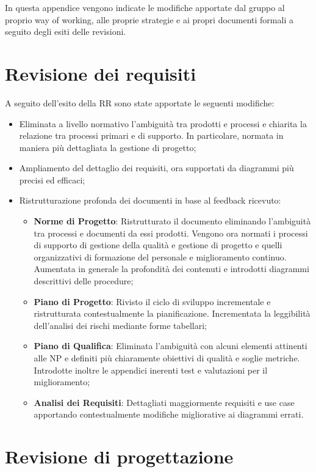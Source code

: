 \documentclass[openany,12pt,a4paper]{report}
\begin{document}
In questa appendice vengono indicate le modifiche apportate dal gruppo al proprio way of working, alle proprie strategie e ai propri documenti formali a seguito degli esiti delle revisioni.

\section{Revisione dei requisiti}

A seguito dell'esito della RR sono state apportate le seguenti modifiche:

\begin{itemize}
	\item Eliminata a livello normativo l’ambiguità tra prodotti e processi e chiarita la relazione tra processi primari e di supporto. In particolare, normata in maniera più dettagliata la gestione di progetto;
	\item Ampliamento del dettaglio dei requisiti, ora supportati da diagrammi più precisi ed efficaci;
	\item Ristrutturazione profonda dei documenti in base al feedback ricevuto:
	\begin{itemize}
		\item \textbf{Norme di Progetto}: Ristrutturato il documento eliminando l'ambiguità tra processi e documenti da essi prodotti. Vengono ora normati i processi di supporto di gestione della qualità e gestione di progetto e quelli organizzativi di formazione del personale e miglioramento continuo. Aumentata in generale la profondità dei contenuti e introdotti diagrammi descrittivi delle procedure;
		\item \textbf{Piano di Progetto}: Rivisto il ciclo di sviluppo incrementale e ristrutturata contestualmente la pianificazione. Incrementata la leggibilità dell'analisi dei rischi mediante forme tabellari;
		\item \textbf{Piano di Qualifica}: Eliminata l'ambiguità con alcuni elementi attinenti alle NP e definiti più chiaramente obiettivi di qualità e soglie metriche. Introdotte inoltre le appendici inerenti test e valutazioni per il miglioramento;
		\item \textbf{Analisi dei Requisiti}: Dettagliati maggiormente requisiti e use case apportando contestualmente modifiche migliorative ai diagrammi errati.
	\end{itemize}
\end{itemize}

\section{Revisione di progettazione}
\end{document}
